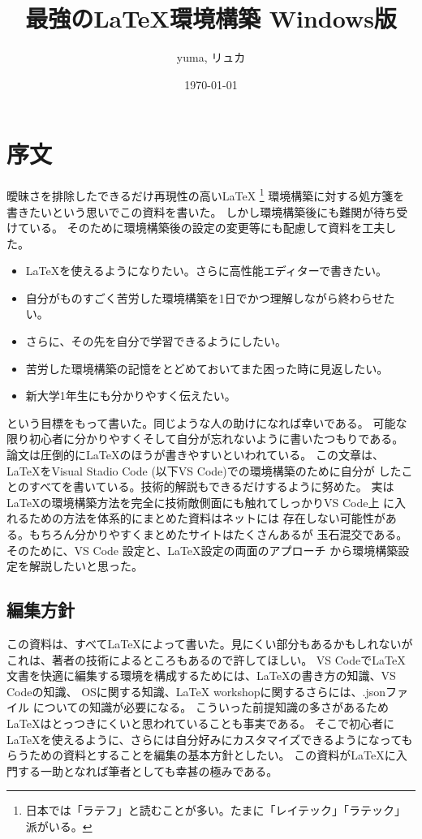 \documentclass{ltjsarticle}
\begin{document}
\title{最強の\LaTeX 環境構築 Windows版}
\author{yuma, リュカ}
\date{\today}
\maketitle
\section{序文}
曖昧さを排除したできるだけ再現性の高い\LaTeX 
\footnote{日本では「ラテフ」と読むことが多い。たまに「レイテック」「ラテック」派がいる。}
環境構築に対する処方箋を書きたいという思いでこの資料を書いた。
しかし環境構築後にも難関が待ち受けている。
そのために環境構築後の設定の変更等にも配慮して資料を工夫した。
\begin{itemize}
  \item \LaTeX を使えるようになりたい。さらに高性能エディターで書きたい。
  \item 自分がものすごく苦労した環境構築を1日でかつ理解しながら終わらせたい。
  \item さらに、その先を自分で学習できるようにしたい。
  \item 苦労した環境構築の記憶をとどめておいてまた困った時に見返したい。
  \item 新大学1年生にも分かりやすく伝えたい。
\end{itemize}
という目標をもって書いた。同じような人の助けになれば幸いである。
可能な限り初心者に分かりやすくそして自分が忘れないように書いたつもりである。
論文は圧倒的に\LaTeX のほうが書きやすいといわれている。
この文章は、\LaTeX をVisual Stadio Code (以下VS Code)での環境構築のために自分が
したことのすべてを書いている。技術的解説もできるだけするように努めた。
実は\LaTeX の環境構築方法を完全に技術敵側面にも触れてしっかりVS Code上
に入れるための方法を体系的にまとめた資料はネットには
存在しない可能性がある。もちろん分かりやすくまとめたサイトはたくさんあるが
玉石混交である。そのために、VS Code 設定と、\LaTeX 設定の両面のアプローチ
から環境構築設定を解説したいと思った。


\subsection{編集方針}

この資料は、すべて\LaTeX によって書いた。見にくい部分もあるかもしれないが
これは、著者の技術によるところもあるので許してほしい。
VS Codeで\LaTeX 文書を快適に編集する環境を構成するためには、\LaTeX の書き方の知識、VS Codeの知識、
OSに関する知識、LaTeX workshopに関するさらには、.jsonファイル
についての知識が必要になる。
こういった前提知識の多さがあるため\LaTeX はとっつきにくいと思われていることも事実である。
そこで初心者に\LaTeX を使えるように、さらには自分好みにカスタマイズできるようになってもらうための資料とすることを編集の基本方針としたい。
この資料が\LaTeX に入門する一助となれば筆者としても幸甚の極みである。
\end{document}
